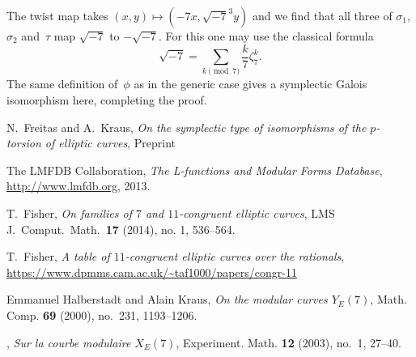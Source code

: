 \documentclass[12pt]{amsart}
\def\legendre#1#2{\displaystyle{\frac{#1}{#2}}}
\numberwithin{equation}{section}
\theoremstyle{definition}
\theoremstyle{remark}
\begin{document}
The twist map takes $(x,y)\mapsto(-7x,\sqrt{-7}^3y)$ and we find that
all three of $\sigma_1$, $\sigma_2$ and~$\tau$ map $\sqrt{-7}$ to
$-\sqrt{-7}$.  For this one may use the classical formula
\[
   \sqrt{-7} = \sum_{k\pmod7}\legendre{k}{7}\zeta_7^k.
\]
The same definition of~$\phi$ as in the generic case gives a
symplectic Galois isomorphism here, completing the proof.

 
\begin{thebibliography}{999}


 N.\ Freitas and A.\ Kraus,
{\em On the symplectic type of isomorphisms of the $p$-torsion of elliptic curves}, Preprint

 The {LMFDB Collaboration},
{\em The L-functions and Modular Forms Database}, \\
\url{http://www.lmfdb.org}, 2013.

 T.\ Fisher,
{\em On families of $7$ and $11$-congruent elliptic curves}, 
LMS J.\ Comput.\ Math.\ {\bf 17} (2014), no. 1, 536--564.

 T.\ Fisher,
{\em A table of $11$-congruent elliptic curves over the rationals}, \\
\url{https://www.dpmms.cam.ac.uk/~taf1000/papers/congr-11}

Emmanuel Halberstadt and Alain Kraus, \emph{On the modular curves {$Y_E(7)$}},
  Math. Comp. \textbf{69} (2000), no.~231, 1193--1206. 

\bysame, \emph{Sur la courbe modulaire {$X_E(7)$}}, Experiment. Math.
  \textbf{12} (2003), no.~1, 27--40. 


\begin{comment}
 
\bibitem{AnniSiksek} S.\ Anni and S.\ Siksek,
{\em Modular elliptic curves over real abelian fields and the generalized {F}ermat equation $x^{2\ell} + y^{2m}=z^p$}, Algebra \& Number Theory {\bf 10} (2016), no.6, 1147--1172


\bibitem{BennetSkinner} M.\ A.\ Bennett and C.\ M.\ Skinner,
{\em Ternary Diophantine equations via Galois representations and modular forms}, Canad.\ J.\ Math.\ {\bf 56} (2004), no. 1, 23--54.
 


\end{comment}
\end{thebibliography}
\end{document}
